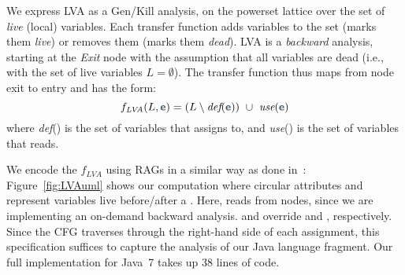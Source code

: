 We express LVA as a Gen/Kill analysis, on the powerset lattice
over the set of \emph{live} (local) variables.
Each transfer function adds variables to the set (marks them \emph{live}) or removes them (marks them \emph{dead}).
LVA is a \emph{backward} analysis, starting at the \emph{Exit} node with the assumption that all variables are dead (i.e., with the set of live variables $L = \emptyset$).
The transfer function thus maps from node exit to entry
 and has the form:
\[
f_{\textit{LVA}}(L, \vterminal{\vmetavar{e}}) =  (L \setminus \textit{def}(\vmetavar{e}))\ \cup\ \textit{use}(\vmetavar{e})
\]
where
\textit{def}() is the set of variables that  assigns to, and
\textit{use}() is the set of variables that  reads.

We encode the $f_{\textit{LVA}}$ using RAGs in a similar way as done in~\cite{10.1016/j.scico.2012.02.002}:
Figure~\ref{fig:LVAuml} shows
our
computation
where circular attributes  and  represent variables live before/after a .
Here,  reads
from  nodes, since we are implementing an on-demand
backward analysis.   and  override
 and , respectively.  Since the CFG traverses
through the right-hand side of each assignment, this specification
suffices to capture the analysis of our Java language fragment.
Our full implementation for Java~7 takes up 38 lines of code.





